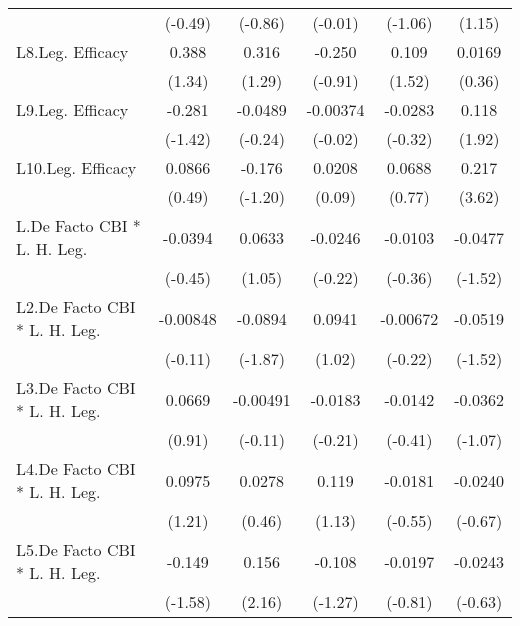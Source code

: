 {\begin{longtable}{l*{5}{c}}
                &  (-0.49)         &  (-0.86)         &  (-0.01)         &  (-1.06)         &   (1.15)         \\
[1em]
L8.Leg. Efficacy&    0.388         &    0.316         &   -0.250         &    0.109         &   0.0169         \\
                &   (1.34)         &   (1.29)         &  (-0.91)         &   (1.52)         &   (0.36)         \\
[1em]
L9.Leg. Efficacy&   -0.281         &  -0.0489         & -0.00374         &  -0.0283         &    0.118         \\
                &  (-1.42)         &  (-0.24)         &  (-0.02)         &  (-0.32)         &   (1.92)         \\
[1em]
L10.Leg. Efficacy&   0.0866         &   -0.176         &   0.0208         &   0.0688         &    0.217\sym{***}\\
                &   (0.49)         &  (-1.20)         &   (0.09)         &   (0.77)         &   (3.62)         \\
[1em]
L.De Facto CBI * L. H. Leg.&  -0.0394         &   0.0633         &  -0.0246         &  -0.0103         &  -0.0477         \\
                &  (-0.45)         &   (1.05)         &  (-0.22)         &  (-0.36)         &  (-1.52)         \\
[1em]
L2.De Facto CBI * L. H. Leg.& -0.00848         &  -0.0894         &   0.0941         & -0.00672         &  -0.0519         \\
                &  (-0.11)         &  (-1.87)         &   (1.02)         &  (-0.22)         &  (-1.52)         \\
[1em]
L3.De Facto CBI * L. H. Leg.&   0.0669         & -0.00491         &  -0.0183         &  -0.0142         &  -0.0362         \\
                &   (0.91)         &  (-0.11)         &  (-0.21)         &  (-0.41)         &  (-1.07)         \\
[1em]
L4.De Facto CBI * L. H. Leg.&   0.0975         &   0.0278         &    0.119         &  -0.0181         &  -0.0240         \\
                &   (1.21)         &   (0.46)         &   (1.13)         &  (-0.55)         &  (-0.67)         \\
[1em]
L5.De Facto CBI * L. H. Leg.&   -0.149         &    0.156\sym{*}  &   -0.108         &  -0.0197         &  -0.0243         \\
                &  (-1.58)         &   (2.16)         &  (-1.27)         &  (-0.81)         &  (-0.63)         \\

\end{longtable}}

